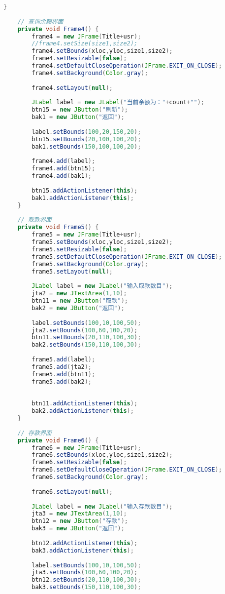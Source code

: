 \begin{lstlisting}[language = java, caption = UI.java]
	}
	
	// 查询余额界面
	private void Frame4() {
		frame4 = new JFrame(Title+usr);
		//frame4.setSize(size1,size2);
		frame4.setBounds(xloc,yloc,size1,size2);
		frame4.setResizable(false);
		frame4.setDefaultCloseOperation(JFrame.EXIT_ON_CLOSE);
		frame4.setBackground(Color.gray);
		
		frame4.setLayout(null);
		
		JLabel label = new JLabel("当前余额为："+count+"");
		btn15 = new JButton("刷新");
		bak1 = new JButton("返回");
		
		label.setBounds(100,20,150,20);
		btn15.setBounds(20,100,100,20);
		bak1.setBounds(150,100,100,20);
		
		frame4.add(label);
		frame4.add(btn15);
		frame4.add(bak1);
		
		btn15.addActionListener(this);
		bak1.addActionListener(this);
	}
	
	// 取款界面
	private void Frame5() {
		frame5 = new JFrame(Title+usr);
		frame5.setBounds(xloc,yloc,size1,size2);
		frame5.setResizable(false);
		frame5.setDefaultCloseOperation(JFrame.EXIT_ON_CLOSE);
		frame5.setBackground(Color.gray);
		frame5.setLayout(null);
		
		JLabel label = new JLabel("输入取款数目");
		jta2 = new JTextArea(1,10);
		btn11 = new JButton("取款");
		bak2 = new JButton("返回");
		
		label.setBounds(100,10,100,50);
		jta2.setBounds(100,60,100,20);
		btn11.setBounds(20,110,100,30);
		bak2.setBounds(150,110,100,30);
		
		frame5.add(label);
		frame5.add(jta2);
		frame5.add(btn11);
		frame5.add(bak2);
		
		
		btn11.addActionListener(this);
		bak2.addActionListener(this);
	}
	
	// 存款界面
	private void Frame6() {
		frame6 = new JFrame(Title+usr);
		frame6.setBounds(xloc,yloc,size1,size2);
		frame6.setResizable(false);
		frame6.setDefaultCloseOperation(JFrame.EXIT_ON_CLOSE);
		frame6.setBackground(Color.gray);
		
		frame6.setLayout(null);
		
		JLabel label = new JLabel("输入存款数目");
		jta3 = new JTextArea(1,10);
		btn12 = new JButton("存款");
		bak3 = new JButton("返回");
		
		btn12.addActionListener(this);
		bak3.addActionListener(this);
		
		label.setBounds(100,10,100,50);
		jta3.setBounds(100,60,100,20);
		btn12.setBounds(20,110,100,30);
		bak3.setBounds(150,110,100,30);
		

\end{lstlisting}
